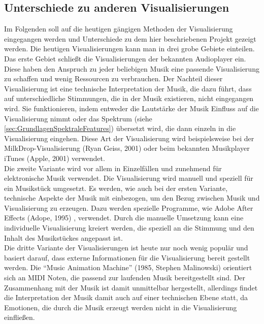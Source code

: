 \documentclass[11pt,a4paper]{article}
\begin{document}
\subsection{Unterschiede zu anderen Visualisierungen}
Im Folgenden soll auf die heutigen gängigen Methoden der Visualisierung eingegangen werden und Unterschiede zu dem hier beschriebenen Projekt gezeigt werden. Die heutigen Visualisierungen kann man in drei grobe Gebiete einteilen.\\
Das erste Gebiet schließt die Visualisierungen der bekannten Audioplayer ein. Diese haben den Anspruch zu jeder beliebigen Musik eine passende Visualisierung zu schaffen und wenig Ressourcen zu verbrauchen. Der Nachteil dieser Visualisierung ist eine technische Interpretation der Musik, die dazu führt, dass auf unterschiedliche Stimmungen, die in der Musik existieren, nicht eingegangen wird. Sie funktionieren, indem entweder die Lautstärke der Musik Einfluss auf die Visualisierung nimmt oder das Spektrum (siehe \ref{sec:GrundlagenSpektraleFeatures}) übersetzt wird, die dann einzeln in die Visualisierung eingehen. Diese Art der Visualisierung wird beispielsweise bei der MilkDrop-Visualisierung (Ryan Geiss, 2001) oder beim bekannten Musikplayer iTunes (Apple, 2001)\cite{appleITunes} verwendet.\\
Die zweite Variante wird vor allem in Einzelfällen und zunehmend für elektronische Musik verwendet. Die Visualisierung wird manuell und speziell für ein Musikstück umgesetzt. Es werden, wie auch bei der ersten Variante, technische Aspekte der Musik mit einbezogen, um den Bezug zwischen Musik und Visualisierung zu erzeugen. Dazu werden spezielle Programme, wie Adobe After Effects (Adope, 1995) \cite{adobeAfterEffects}, verwendet. Durch die manuelle Umsetzung kann eine individuelle Visualisierung kreiert werden, die speziell an die Stimmung und den Inhalt des Musikstückes angepasst ist.\\
Die dritte Variante der Visualisierungen ist heute nur noch wenig populär und basiert darauf, dass externe Informationen für die Visualisierung bereit gestellt werden. Die ``Music Animation Machine'' (1985, Stephen Malinowski) \cite{MusikAnimationMachine} orientiert sich an MIDI Noten, die passend zur laufenden Musik bereitgestellt sind. Der Zusammenhang mit der Musik ist damit unmittelbar hergestellt, allerdings findet die Interpretation der Musik damit auch auf einer technischen Ebene statt, da Emotionen, die durch die Musik erzeugt werden nicht in die Visualisierung einfließen.
\end{document}
